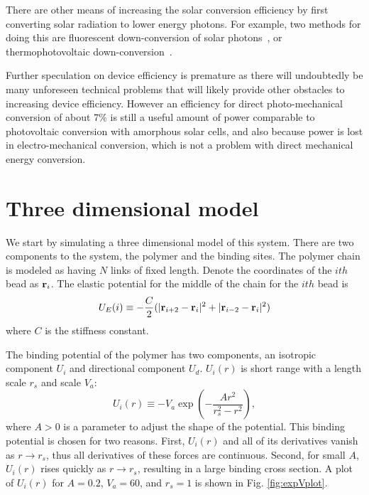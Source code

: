 \documentclass[11pt]{ucthesis}
\def\br{{\bf r}}
\begin{document}
There are other means of increasing the solar conversion efficiency by first converting solar radiation to 
lower energy photons. For example, two methods for doing this are fluorescent down-conversion of solar
photons~\cite{Klampfatis}, or thermophotovoltaic down-conversion~\cite{Harder}.

Further speculation on device efficiency is premature as there will undoubtedly
be many unforeseen technical problems that will likely provide other obstacles
to increasing device efficiency. However an efficiency for direct
photo-mechanical conversion of about $7\%$ is still a useful amount of power
comparable to photovoltaic conversion with amorphous solar cells, and also because
power is lost in electro-mechanical conversion, which is not a problem with
direct mechanical energy conversion.

\section{Three dimensional model}
\label{sec:3Dmodel}

We start by simulating a three dimensional model of this system. There are two
components to the system, the polymer and the binding sites. The polymer chain
is modeled as having $N$ links of fixed length. Denote the coordinates of the $ith$ bead as $\br_i$. The elastic potential for the middle of the chain
for the $ith$ bead is
\begin{equation}
U_E(i) \equiv -\frac{C}{2}(|\br_{i+2}-\br_i|^2 + |\br_{i-2}-\br_i|^2)
\end{equation}
where $C$ is the stiffness constant.

The binding potential of the polymer has two components, an isotropic component
$U_i$ and directional component $U_d$. $U_i(r)$ is short range with a length
scale $r_s$ and scale $V_a$:
\begin{equation}
U_i(r) \equiv -V_a \exp\left(-\frac{A r^2}{r_s^2 - r^2}\right),
\label{eq:expU}
\end{equation}
where $A > 0$ is a parameter to adjust the shape of the potential. This binding potential is chosen for two reasons. First, $U_i(r)$ and all of its derivatives vanish as $r\rightarrow r_s$, thus all derivatives of these forces are continuous. Second, for small $A$, $U_i(r)$ rises quickly as $r\rightarrow r_s$, resulting in a large binding cross section. A plot of $U_i(r)$ for $A = 0.2$, $V_a = 60$, and $r_s = 1$ is shown in Fig. \ref{fig:expVplot}.
\end{document}
